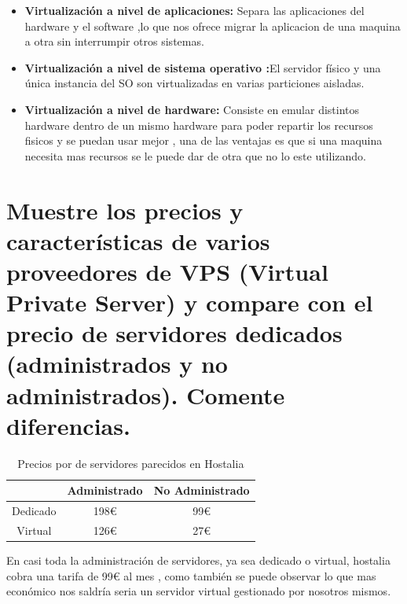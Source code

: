 \begin{itemize}
\item \textbf{Virtualización a nivel de aplicaciones:} Separa las aplicaciones del hardware y el software ,lo que nos ofrece migrar la aplicacion de una maquina a otra sin interrumpir otros sistemas.
\item \textbf{Virtualización a nivel de sistema operativo :}El servidor físico y una única instancia del SO son virtualizadas en varias particiones aisladas.
\item \textbf{Virtualización a nivel de hardware:} Consiste en emular distintos hardware dentro de un mismo hardware para poder repartir los recursos fisicos y se puedan usar mejor , una de las ventajas es que si una maquina necesita mas recursos se le puede dar de otra que no lo este utilizando.
\end{itemize}




\section{Muestre los precios y características de varios proveedores de VPS (Virtual Private Server) y compare con el precio de servidores dedicados (administrados y no administrados). Comente diferencias.}

\begin{table}[H]
	\centering
	\begin{tabular}{|c|c|c|}
		\hline
		\textbf{	} & \textbf{Administrado} & \textbf{No Administrado} \\
		\hline
		Dedicado & 198\textup{\euro} & 99\textup{\euro} \\
		\hline
		Virtual & 126\textup{\euro} & 27\textup{\euro} \\
		\hline
	\end{tabular}  
	\caption{Precios por de servidores parecidos en Hostalia} \label{tab:tablaPrecios}
\end{table}

En casi toda la administración de servidores, ya sea dedicado o virtual, hostalia \cite{hostalia} cobra una tarifa de 99\textup{\euro} al mes , como también se puede observar lo que mas económico nos saldría seria un servidor virtual gestionado por nosotros mismos.

